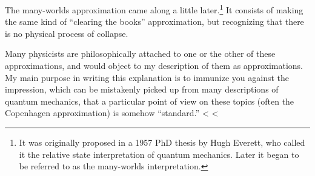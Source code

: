 The many-worlds approximation came along a little later.\footnote{It was
originally proposed in a 1957 PhD thesis by Hugh Everett, who called it
the relative state interpretation of quantum mechanics. Later it began
to be referred to as the many-worlds interpretation.} It consists of
making the same kind of ``clearing the books'' approximation, but recognizing
that there is no physical process of collapse. 

Many physicists are philosophically attached to one or the other of these
approximations, and would object to my description of them as approximations.
My main purpose in writing this explanation is to immunize you against the
impression, which can be mistakenly picked up from many descriptions of quantum
mechanics, that a particular point of view on these topics (often the Copenhagen
approximation) is somehow ``standard.''
<%
<%
